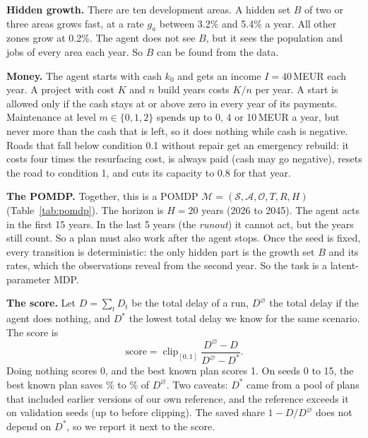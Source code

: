 \documentclass{article}
\begin{document}
\textbf{Hidden growth.} There are ten development areas. A hidden set $B$ of two or three areas grows fast, at a rate $g_a$ between 3.2\% and 5.4\% a year. All other zones grow at 0.2\%. The agent does not see $B$, but it sees the population and jobs of every area each year. So $B$ can be found from the data.

\textbf{Money.} The agent starts with cash $k_0$ and gets an income $I=40$\,MEUR each year. A project with cost $K$ and $n$ build years costs $K/n$ per year. A start is allowed only if the cash stays at or above zero in every year of its payments. Maintenance at level $m\in\{0,1,2\}$ spends up to 0, 4 or 10\,MEUR a year, but never more than the cash that is left, so it does nothing while cash is negative. Roads that fall below condition 0.1 without repair get an emergency rebuild: it costs four times the resurfacing cost, is always paid (cash may go negative), resets the road to condition 1, and cuts its capacity to 0.8 for that year.

\textbf{The POMDP.} Together, this is a POMDP $\mathcal{M}=(\mathcal{S},\mathcal{A},\mathcal{O},T,R,H)$ (Table~\ref{tab:pomdp}). The horizon is $H=20$ years (2026 to 2045). The agent acts in the first 15 years. In the last 5 years (the \emph{runout}) it cannot act, but the years still count. So a plan must also work after the agent stops. Once the seed is fixed, every transition is deterministic: the only hidden part is the growth set $B$ and its rates, which the observations reveal from the second year. So the task is a latent-parameter MDP.

\textbf{The score.} Let $D=\sum_{t}D_t$ be the total delay of a run, $D^{\varnothing}$ the total delay if the agent does nothing, and $D^{*}$ the lowest total delay we know for the same scenario. The score is
\begin{equation}
\text{score}=\operatorname{clip}_{[0,1]}\frac{D^{\varnothing}-D}{D^{\varnothing}-D^{*}}.
\end{equation}
Doing nothing scores 0, and the best known plan scores 1. On seeds 0 to 15, the best known plan saves \bestPctMin{}\% to \bestPctMax{}\% of $D^{\varnothing}$. Two caveats: $D^{*}$ came from a pool of plans that included earlier versions of our own reference, and the reference exceeds it on \ExploitRefOverOne{} validation seeds (up to \valRlScoreMax{} before clipping). The saved share $1-D/D^{\varnothing}$ does not depend on $D^{*}$, so we report it next to the score.
\end{document}
